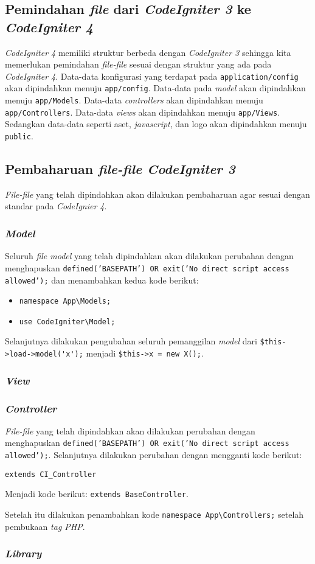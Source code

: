\begin{center}
	\verb||
\end{center}

\subsection{Pemindahan \textit{file} dari \textit{CodeIgniter 3} ke \textit{CodeIgniter 4}}
\textit{CodeIgniter 4} memiliki struktur berbeda dengan \textit{CodeIgniter 3} sehingga kita memerlukan pemindahan \textit{file-file} sesuai dengan struktur yang ada pada \textit{CodeIgniter 4}. Data-data konfigurasi yang terdapat pada \texttt{application/config} akan dipindahkan menuju \texttt{app/config}. Data-data pada \textit{model} akan dipindahkan menuju \verb|app/Models|. Data-data \textit{controllers} akan dipindahkan menuju \verb|app/Controllers|. Data-data \textit{views} akan dipindahkan menuju \verb|app/Views|. Sedangkan data-data seperti aset, \textit{javascript}, dan logo akan dipindahkan menuju \verb|public|.

\subsection{Pembaharuan \textit{file-file CodeIgniter 3}}
\textit{File-file} yang telah dipindahkan akan dilakukan pembaharuan agar sesuai dengan standar pada \textit{CodeIgnier 4}. 
\subsubsection{\textit{Model}}
Seluruh \textit{file model} yang telah dipindahkan akan dilakukan perubahan dengan menghapuskan \texttt{defined('BASEPATH') OR exit('No direct script access allowed');} dan menambahkan kedua kode berikut:
\begin{itemize}
	\item \verb|namespace App\Models;|
	\item \verb|use CodeIgniter\Model;|
\end{itemize}

Selanjutnya dilakukan pengubahan seluruh pemanggilan \textit{model} dari \verb|$this->load->model('x');| menjadi \verb|$this->x = new X();|.

\subsubsection{\textit{View}}
\subsubsection{\textit{Controller}}
\textit{File-file} yang telah dipindahkan akan dilakukan perubahan dengan menghapuskan \texttt{defined('BASEPATH') OR exit('No direct script access allowed');}. Selanjutnya dilakukan perubahan dengan mengganti kode berikut:
\begin{center}
	\verb|extends CI_Controller|
\end{center}
\begin{center}
Menjadi kode berikut:
	\verb|extends BaseController|.
\end{center}

Setelah itu dilakukan penambahkan kode \verb|namespace App\Controllers;| setelah pembukaan \textit{tag PHP}.
\subsubsection{\textit{Library}}
